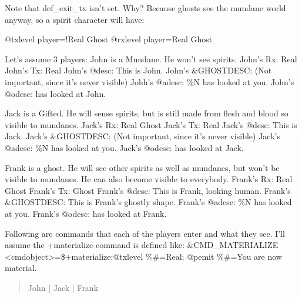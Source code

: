 \documentclass[letterpaper,10pt,english]{sphinxmanual}
\begin{document}
\sphinxAtStartPar
Note that def\_exit\_tx isn’t set. Why? Because ghosts see the mundane world
anyway, so a spirit character will have:

\begin{sphinxVerbatim}[commandchars=\\\{\}]
@txlevel \PYGZlt{}player\PYGZgt{}=!Real Ghost
@rxlevel \PYGZlt{}player\PYGZgt{}=Real Ghost
\end{sphinxVerbatim}

\sphinxAtStartPar
Let’s assume 3 players:
John is a Mundane. He won’t see spirits.
John’s Rx: Real
John’s Tx: Real
John’s @desc: This is John.
John’s \&GHOSTDESC: (Not important, since it’s never visible)
Johh’s @adesc: \%N has looked at you.
John’s @odesc: has looked at John.

\sphinxAtStartPar
Jack is a Gifted. He will sense spirits, but is still made from flesh
and blood so visible to mundanes.
Jack’s Rx: Real Ghost
Jack’s Tx: Real
Jack’s @desc: This is Jack.
Jack’s \&GHOSTDESC: (Not important, since it’s never visible)
Jack’s @adesc: \%N has looked at you.
Jack’s @odesc: has looked at Jack.

\sphinxAtStartPar
Frank is a ghost. He will see other spirits as well as mundanes, but won’t
be visible to mundanes. He can also become visible to everybody.
Frank’s Rx: Real Ghost
Frank’s Tx: Ghost
Frank’s @desc: This is Frank, looking human.
Frank’s \&GHOSTDESC: This is Frank’s ghostly shape.
Frank’s @adesc: \%N has looked at you.
Frank’s @odesc: has looked at Frank.

\sphinxAtStartPar
Following are commands that each of the players enter and what they see.
I’ll assume the +materialize command is defined like:
\&CMD\_MATERIALIZE \textless{}cmdobject\textgreater{}=\$+materialize:@txlevel \%\#=Real; @pemit \%\#=You
are now material.
\begin{quote}
\begin{description}
\item[{John            |         Jack          |         Frank}] \leavevmode
\begin{DUlineblock}{0em}
\item[] {\color{red}\bfseries{}|}
\end{DUlineblock}

\end{description}
\end{quote}
\end{document}
